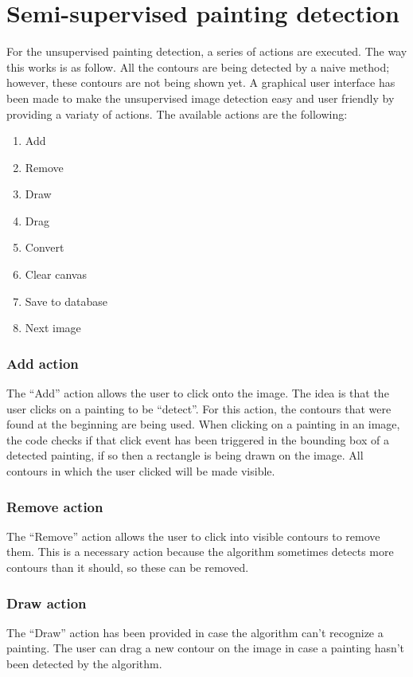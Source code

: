 \section{Semi-supervised painting detection}
For the unsupervised painting detection, a series of actions are executed. The way this works is as follow. All the contours are being detected by a naive method; however, these contours are not being shown yet. A graphical user interface has been made to make the unsupervised image detection easy and user friendly by providing a variaty of actions. The available actions are the following:
\begin{enumerate}
    \item Add
    \item Remove
    \item Draw
    \item Drag
    \item Convert
    \item Clear canvas
    \item Save to database
    \item Next image
\end{enumerate}

\subsubsection{Add action}
The ``Add'' action allows the user to click onto the image. The idea is that the user clicks on a painting to be ``detect''. For this action, the contours that were found at the beginning are being used. When clicking on a painting in an image, the code checks if that click event has been triggered in the bounding box of a detected painting, if so then a rectangle is being drawn on the image. All contours in which the user clicked will be made visible.

\subsubsection{Remove action}
The ``Remove'' action allows the user to click into visible contours to remove them. This is a necessary action because the algorithm sometimes detects more contours than it should, so these can be removed.

\subsubsection{Draw action}
The ``Draw'' action has been provided in case the algorithm can't recognize a painting. The user can drag a new contour on the image in case a painting hasn't been detected by the algorithm.

